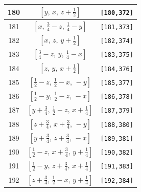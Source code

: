 \documentclass[fleqn,8pt]{jsarticle}
\begin{document}
\begin{longtable}{ccc}
180 & $\left[ y,\, x,\, z + \frac{1}{2} \right]$ & {\tt [180,372]} \\ \hline
181 & $\left[ x,\, \frac{3}{4} - z,\, \frac{1}{4} - y \right]$ & {\tt [181,373]} \\ \hline
182 & $\left[ x,\, z,\, y + \frac{1}{2} \right]$ & {\tt [182,374]} \\ \hline
183 & $\left[ \frac{3}{4} - z,\, y,\, \frac{1}{4} - x \right]$ & {\tt [183,375]} \\ \hline
184 & $\left[ z,\, y,\, x + \frac{1}{2} \right]$ & {\tt [184,376]} \\ \hline
185 & $\left[ \frac{1}{2} - z,\, \frac{1}{2} - x,\, - y \right]$ & {\tt [185,377]} \\ \hline
186 & $\left[ \frac{1}{2} - y,\, \frac{1}{2} - z,\, - x \right]$ & {\tt [186,378]} \\ \hline
187 & $\left[ y + \frac{3}{4},\, \frac{1}{2} - z,\, x + \frac{1}{4} \right]$ & {\tt [187,379]} \\ \hline
188 & $\left[ z + \frac{3}{4},\, x + \frac{3}{4},\, - y \right]$ & {\tt [188,380]} \\ \hline
189 & $\left[ y + \frac{3}{4},\, z + \frac{3}{4},\, - x \right]$ & {\tt [189,381]} \\ \hline
190 & $\left[ \frac{1}{2} - z,\, x + \frac{3}{4},\, y + \frac{1}{4} \right]$ & {\tt [190,382]} \\ \hline
191 & $\left[ \frac{1}{2} - y,\, z + \frac{3}{4},\, x + \frac{1}{4} \right]$ & {\tt [191,383]} \\ \hline
192 & $\left[ z + \frac{3}{4},\, \frac{1}{2} - x,\, y + \frac{1}{4} \right]$ & {\tt [192,384]} \\
\end{longtable}
\end{document}
